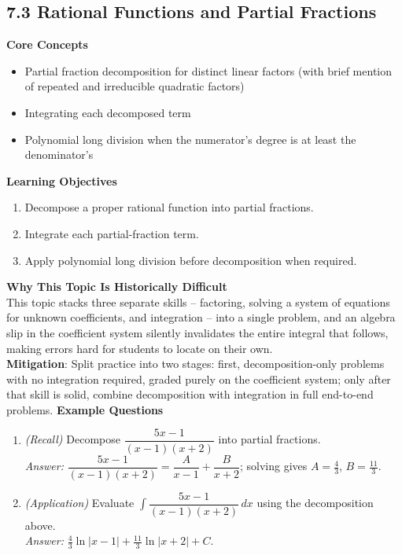 \documentclass[11pt]{article}
\begin{document}
\subsection{7.3 Rational Functions and Partial Fractions}
\textbf{Core Concepts}
\begin{itemize}
\item Partial fraction decomposition for distinct linear factors (with brief mention of repeated and irreducible quadratic factors)
\item Integrating each decomposed term
\item Polynomial long division when the numerator's degree is at least the denominator's
\end{itemize}
\textbf{Learning Objectives}
\begin{enumerate}
\item Decompose a proper rational function into partial fractions.
\item Integrate each partial-fraction term.
\item Apply polynomial long division before decomposition when required.
\end{enumerate}
\textbf{Why This Topic Is Historically Difficult} \\
This topic stacks three separate skills -- factoring, solving a system of equations for unknown coefficients, and integration -- into a single problem, and an algebra slip in the coefficient system silently invalidates the entire integral that follows, making errors hard for students to locate on their own. \\
\textbf{Mitigation}: Split practice into two stages: first, decomposition-only problems with no integration required, graded purely on the coefficient system; only after that skill is solid, combine decomposition with integration in full end-to-end problems.
\textbf{Example Questions}
\begin{enumerate}
\item \emph{(Recall)} Decompose $\dfrac{5x-1}{(x-1)(x+2)}$ into partial fractions. \\
\textit{Answer:} $\dfrac{5x-1}{(x-1)(x+2)} = \dfrac{A}{x-1}+\dfrac{B}{x+2}$; solving gives $A=\tfrac{4}{3}$, $B=\tfrac{11}{3}$.
\item \emph{(Application)} Evaluate $\displaystyle\int \dfrac{5x-1}{(x-1)(x+2)}\,dx$ using the decomposition above. \\
\textit{Answer:} $\tfrac{4}{3}\ln|x-1| + \tfrac{11}{3}\ln|x+2| + C$.
\end{enumerate}
\end{document}
